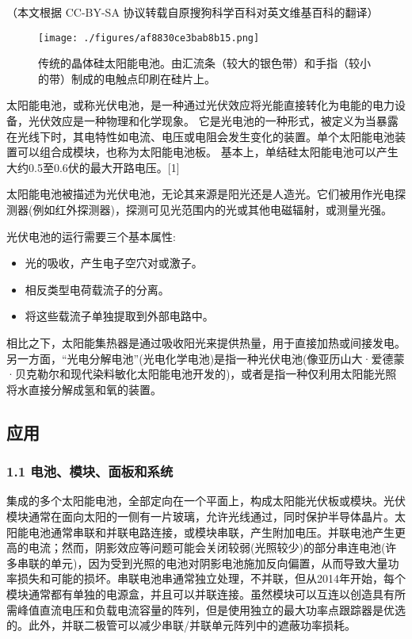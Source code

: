 
（本文根据 CC-BY-SA 协议转载自原搜狗科学百科对英文维基百科的翻译）

\begin{figure}[ht]
\centering
\texttt{[image: ./figures/af8830ce3bab8b15.png]}
\caption{传统的晶体硅太阳能电池。由汇流条（较大的银色带）和手指（较小的带）制成的电触点印刷在硅片上。} \label{fig_TYNDC_1}
\end{figure}

太阳能电池，或称光伏电池，是一种通过光伏效应将光能直接转化为电能的电力设备，光伏效应是一种物理和化学现象。 它是光电池的一种形式，被定义为当暴露在光线下时，其电特性如电流、电压或电阻会发生变化的装置。单个太阳能电池装置可以组合成模块，也称为太阳能电池板。 基本上，单结硅太阳能电池可以产生大约0.5至0.6伏的最大开路电压。[1]

太阳能电池被描述为光伏电池，无论其来源是阳光还是人造光。它们被用作光电探测器(例如红外探测器)，探测可见光范围内的光或其他电磁辐射，或测量光强。

光伏电池的运行需要三个基本属性:
\begin{itemize}
\item 光的吸收，产生电子空穴对或激子。
\item 相反类型电荷载流子的分离。
\item 将这些载流子单独提取到外部电路中。
\end{itemize}

相比之下，太阳能集热器是通过吸收阳光来提供热量，用于直接加热或间接发电。另一方面，“光电分解电池”(光电化学电池)是指一种光伏电池(像亚历山大·爱德蒙·贝克勒尔和现代染料敏化太阳能电池开发的)，或者是指一种仅利用太阳能光照将水直接分解成氢和氧的装置。

\subsection{应用}



\subsubsection{1.1 电池、模块、面板和系统}

集成的多个太阳能电池，全部定向在一个平面上，构成太阳能光伏板或模块。光伏模块通常在面向太阳的一侧有一片玻璃，允许光线通过，同时保护半导体晶片。太阳能电池通常串联和并联电路连接，或模块串联，产生附加电压。并联电池产生更高的电流；然而，阴影效应等问题可能会关闭较弱(光照较少)的部分串连电池(许多串联的单元)，因为受到光照的电池对阴影电池施加反向偏置，从而导致大量功率损失和可能的损坏。串联电池串通常独立处理，不并联，但从2014年开始，每个模块通常都有单独的电源盒，并且可以并联连接。虽然模块可以互连以创造具有所需峰值直流电压和负载电流容量的阵列，但是使用独立的最大功率点跟踪器是优选的。此外，并联二极管可以减少串联/并联单元阵列中的遮蔽功率损耗。

